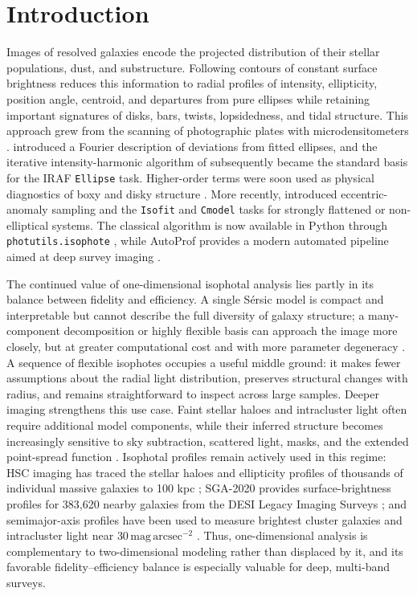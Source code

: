 \section{Introduction}\label{sec:introduction}

Images of resolved galaxies encode the projected distribution of their
stellar populations, dust, and substructure. Following contours of constant
surface brightness reduces this information to radial profiles of intensity,
ellipticity, position angle, centroid, and departures from pure ellipses while
retaining important signatures of disks, bars, twists, lopsidedness, and tidal
structure. This approach grew from the scanning of photographic plates with
microdensitometers \citep{Fraser1967}. \citet{Carter1978} introduced a Fourier
description of deviations from fitted ellipses, and the iterative
intensity-harmonic algorithm of \citet{Jedrzejewski1987} subsequently became
the standard basis for the IRAF \texttt{Ellipse} task. Higher-order terms were
soon used as physical diagnostics of boxy and disky structure
\citep{Bender1988,Bender1989}. More recently, \citet{Ciambur2015} introduced
eccentric-anomaly sampling and the \texttt{Isofit} and \texttt{Cmodel} tasks
for strongly flattened or non-elliptical systems. The classical algorithm is
now available in Python through \texttt{photutils.isophote}
\citep{Bradley2025}, while AutoProf provides a modern automated pipeline aimed
at deep survey imaging \citep{Stone2021}.

The continued value of one-dimensional isophotal analysis lies partly in its
balance between fidelity and efficiency. A single S\'ersic model is compact
and interpretable but cannot describe the full diversity of galaxy structure;
a many-component decomposition or highly flexible basis can approach the
image more closely, but at greater computational cost and with more parameter
degeneracy \citep{Peng2010,Erwin2015,Robotham2017}. A sequence of flexible
isophotes occupies a useful middle ground: it makes fewer assumptions about
the radial light distribution, preserves structural changes with radius, and
remains straightforward to inspect across large samples. Deeper imaging
strengthens this use case. Faint stellar haloes and intracluster light often
require additional model components, while their inferred structure becomes
increasingly sensitive to sky subtraction, scattered light, masks, and the
extended point-spread function \citep{Abraham2014,Duc2015,Trujillo2016}.
Isophotal profiles remain actively used in this regime: HSC imaging has traced
the stellar haloes and ellipticity profiles of thousands of individual massive
galaxies to 100 kpc \citep{Huang2018}; SGA-2020 provides surface-brightness
profiles for 383,620 nearby galaxies from the DESI Legacy Imaging Surveys
\citep{Moustakas2023}; and semimajor-axis profiles have been used to measure
brightest cluster galaxies and intracluster light near
$30\,\mathrm{mag\,arcsec^{-2}}$ \citep{Kluge2020}. Thus, one-dimensional
analysis is complementary to two-dimensional modeling rather than displaced
by it, and its favorable fidelity--efficiency balance is especially valuable
for deep, multi-band surveys.

